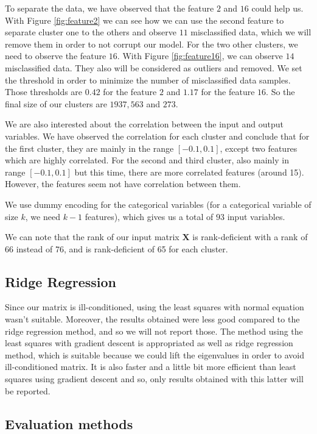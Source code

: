 \documentclass{article} %
\begin{document}
To separate the data, we have observed that the feature $2$ and $16$ could help us. With Figure \ref{fig:feature2} we can see how we can use the second feature to separate cluster one to the others and observe $11$ misclassified data, which we will remove them in order to not corrupt our model. For the two other clusters, we need to observe the feature $16$. With Figure \ref{fig:feature16}, we can observe $14$ misclassified data. They also will be considered as outliers and removed. We set the threshold in order to minimize the number of misclassified data samples. Those thresholds are $0.42$ for the feature $2$ and $1.17$ for the feature $16$. So the final size of our clusters are $1937, 563$ and $273$.

We are also interested about the correlation between the input and output variables. We have observed the correlation for each cluster and conclude that for the first cluster, they are mainly in the range $[-0.1,0.1]$, except two features which are highly correlated. For the second and third cluster, also mainly in range $[-0.1,0.1]$ but this time, there are more correlated features (around 15). However, the features seem not have correlation between them.

We use dummy encoding for the categorical variables (for a categorical variable of size $k$, we need $k-1$ features), which gives us a total of $93$ input variables.

We can note that the rank of our input matrix $\mathbf{X}$ is rank-deficient with a rank of 66 instead of 76, and is rank-deficient of 65 for each cluster.
\vspace{-0.5em}
\subsection{Ridge Regression}

Since our matrix is ill-conditioned, using the least squares with normal equation wasn't suitable. Moreover, the results obtained were less good compared to the ridge regression method, and so we will not report those. The method using the least squares with gradient descent is appropriated as well as ridge regression method, which is suitable because we could lift the eigenvalues in order to avoid ill-conditioned matrix. It is also faster and a little bit more efficient than least squares using gradient descent and so, only results obtained with this latter will be reported.

\subsection{Evaluation methods}
\end{document}

